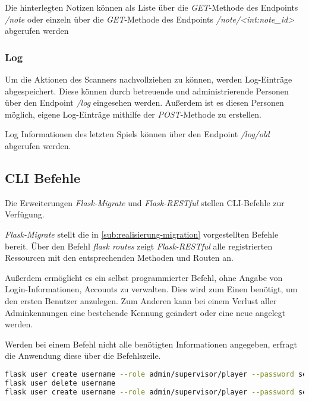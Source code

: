 Die hinterlegten Notizen können als Liste über die \textit{GET}-Methode des Endpoints \textit{/note} oder einzeln über die \textit{GET}-Methode des Endpoints \textit{/note/<int:note\_id>} abgerufen werden

\subsubsection{Log}
Um die Aktionen des Scanners nachvollziehen zu können, werden Log-Einträge abgespeichert. Diese können durch betreuende und administrierende Personen über den Endpoint \textit{/log} eingesehen werden. Außerdem ist es diesen Personen möglich, eigene Log-Einträge mithilfe der \textit{POST}-Methode zu erstellen.

Log Informationen des letzten Spiels können über den Endpoint \textit{/log/old} abgerufen werden.
	
\subsection{CLI Befehle}
Die Erweiterungen \textit{Flask-Migrate} und \textit{Flask-RESTful} stellen CLI-Befehle zur Verfügung. 


\textit{Flask-Migrate} stellt die in \autoref{sub:realisierung-migration} vorgestellten Befehle bereit. Über den Befehl \textit{flask routes} zeigt \textit{Flask-RESTful} alle registrierten Ressourcen mit den entsprechenden Methoden und Routen an.

Außerdem ermöglicht es ein selbst programmierter Befehl, ohne Angabe von \linebreak
Login-Informationen, Accounts zu verwalten. Dies wird zum Einen benötigt, um den ersten Benutzer anzulegen. Zum Anderen kann bei einem Verlust aller Adminkennungen eine bestehende Kennung geändert oder eine neue angelegt werden. 

Werden bei einem Befehl nicht alle benötigten Informationen angegeben, erfragt die Anwendung diese über die Befehlszeile.

\begin{lstlisting}[language=bash, frame=single, caption={GIS CLI}, captionpos=b, label={lst:gis-cli}]
flask user create username --role admin/supervisor/player --password secure_pw
flask user delete username
flask user create username --role admin/supervisor/player --password secure_pw
\end{lstlisting}